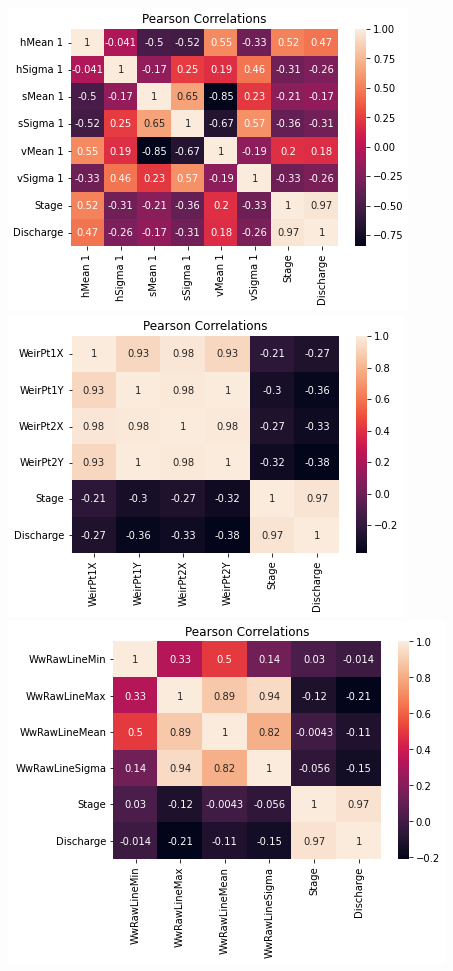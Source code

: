 \documentclass{article}
\begin{document}
\begin{center}
            \includegraphics{images/Corr_pearson8.PNG}
            \includegraphics{images/Corr_pearson9.PNG}
            \includegraphics{images/Corr_pearson10.PNG}
       \end{center}   
\end{document}
